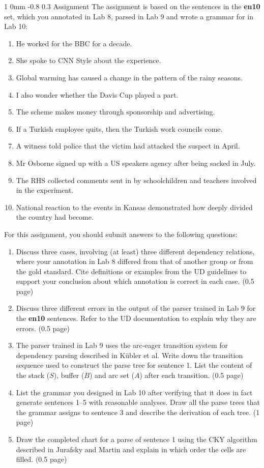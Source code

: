\documentclass[11pt]{article}
\makeatletter
\renewcommand{\section}{\@startsection
{section}%
{1}%
{0mm}%
{-0.8\baselineskip}%
{0.3\baselineskip}%
{\bfseries\large}}%
\makeatother
\begin{document}
\section{Assignment}
\noindent
The assignment is based on the sentences in the \textbf{en10} set, which you annotated in Lab 8, parsed in Lab 9
and wrote a grammar for in Lab 10:
\begin{enumerate}[noitemsep]
\item He worked for the BBC for a decade.
\item She spoke to CNN Style about the experience.
\item Global warming has caused a change in the pattern of the rainy seasons.
\item I also wonder whether the Davis Cup played a part.
\item The scheme makes money through sponsorship and advertising.
\item If a Turkish employee quits, then the Turkish work councils come.
\item A witness told police that the victim had attacked the suspect in April.
\item Mr Osborne signed up with a US speakers agency after being sacked in July.
\item The RHS collected comments sent in by schoolchildren and teachers involved in the experiment.
\item National reaction to the events in Kansas demonstrated how deeply divided the country had become.
\end{enumerate}
For this assignment, you should submit answers to the following questions:
\begin{enumerate}[itemsep=3pt]
\item Discuss three cases, involving (at least) three different dependency relations, where your annotation in Lab 8 differed from that of another group or from the gold standard. 
Cite definitions or examples from the UD guidelines to support your conclusion about which annotation is correct in each case. (0.5 page) 
\item Discuss three different errors in the output of the parser trained in Lab 9 for the \textbf{en10} sentences. Refer to the UD documentation to explain why they are errors. (0.5 page)
\item The parser trained in Lab 9 uses the arc-eager transition system for dependency parsing described in K\"{u}bler et al. Write down the transition sequence used to construct the parse tree for sentence 1. List the content of the stack ($S$), buffer ($B$) and arc set ($A$) after each transition. (0.5 page)
\item List the grammar you designed in Lab 10 after verifying that it does in fact generate sentences 1--5 with reasonable analyses. Draw all the parse trees that the grammar assigns to sentence 3 and describe the derivation of each tree. (1 page) 
\item Draw the completed chart for a parse of sentence 1 using the CKY algorithm described in Jurafsky and Martin and explain in which order the cells are filled. (0.5 page)
\end{enumerate}
\end{document}
